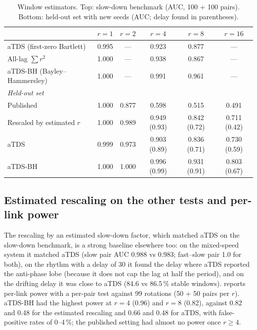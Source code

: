 \documentclass[11pt,a4paper]{article}
\begin{document}
\begin{table}[t]
\centering
\caption{Window estimators. Top: slow-down benchmark (AUC, 100 + 100 pairs). Bottom: held-out set with new seeds (AUC; delay found in parentheses).}
\label{tab:bh}
\footnotesize
\begin{tabular}{lccccc}
\toprule
 & $r = 1$ & $r = 2$ & $r = 4$ & $r = 8$ & $r = 16$ \\
\midrule
aTDS (first-zero Bartlett) & 0.995 & --- & 0.923 & 0.877 & --- \\
All-lag $\sum r^2$ & 1.000 & --- & 0.938 & 0.867 & --- \\
aTDS-BH (Bayley--Hammersley) & 1.000 & --- & 0.991 & 0.961 & --- \\
\midrule
\multicolumn{6}{l}{\emph{Held-out set}} \\
Published & 1.000 & 0.877 & 0.598 & 0.515 & 0.491 \\
Rescaled by estimated $r$ & 1.000 & 0.989 & 0.949 (0.93) & 0.842 (0.72) & 0.711 (0.42) \\
aTDS & 0.999 & 0.973 & 0.903 (0.89) & 0.836 (0.71) & 0.730 (0.59) \\
aTDS-BH & 1.000 & 1.000 & 0.996 (0.99) & 0.931 (0.91) & 0.803 (0.67) \\
\bottomrule
\end{tabular}
\end{table}

\subsection{Estimated rescaling on the other tests and per-link power}
\label{sec:res-power}
The rescaling by an estimated slow-down factor, which matched aTDS on the slow-down benchmark, is a strong baseline elsewhere too: on the mixed-speed system it matched aTDS (slow pair AUC 0.988 vs 0.983; fast--slow pair 1.0 for both), on the rhythm with a delay of 30 it found the delay where aTDS reported the anti-phase lobe (because it does not cap the lag at half the period), and on the drifting delay it was close to aTDS (84.6 vs 86.5\,\% stable windows).  reports per-link power with a per-pair test against 99 rotations (50 + 50 pairs per $r$). aTDS-BH had the highest power at $r = 4$ (0.96) and $r = 8$ (0.82), against 0.82 and 0.48 for the estimated rescaling and 0.66 and 0.48 for aTDS, with false-positive rates of 0--4\,\%; the published setting had almost no power once $r \ge 4$.
\end{document}
